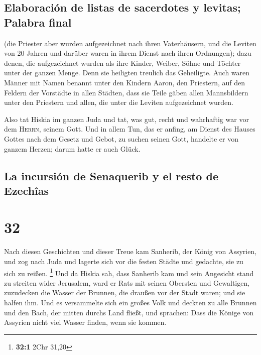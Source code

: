 \hypertarget{elaboraciuxf3n-de-listas-de-sacerdotes-y-levitas-palabra-final}{%
\subsection{Elaboración de listas de sacerdotes y levitas; Palabra
final}\label{elaboraciuxf3n-de-listas-de-sacerdotes-y-levitas-palabra-final}}

 (die Priester aber wurden aufgezeichnet nach ihren
Vaterhäusern, und die Leviten von 20 Jahren und darüber waren in ihrem
Dienst nach ihren Ordnungen);  dazu denen, die
aufgezeichnet wurden als ihre Kinder, Weiber, Söhne und Töchter unter
der ganzen Menge. Denn sie heiligten treulich das Geheiligte.
 Auch waren Männer mit Namen benannt unter den Kindern
Aaron, den Priestern, auf den Feldern der Vorstädte in allen Städten,
dass sie Teile gäben allen Mannsbildern unter den Priestern und allen,
die unter die Leviten aufgezeichnet wurden.

 Also tat Hiskia im ganzen Juda und tat, was gut, recht
und wahrhaftig war vor dem \textsc{Herrn}, seinem Gott. 
Und in allem Tun, das er anfing, am Dienst des Hauses Gottes nach dem
Gesetz und Gebot, zu suchen seinen Gott, handelte er von ganzem Herzen;
darum hatte er auch Glück.

\hypertarget{la-incursiuxf3n-de-senaquerib-y-el-resto-de-ezechuxeeas}{%
\subsection{La incursión de Senaquerib y el resto de
Ezechîas}\label{la-incursiuxf3n-de-senaquerib-y-el-resto-de-ezechuxeeas}}

\hypertarget{section-31}{%
\section{32}\label{section-31}}

 Nach diesen Geschichten und dieser Treue kam Sanherib,
der König von Assyrien, und zog nach Juda und lagerte sich vor die
festen Städte und gedachte, sie zu sich zu reißen. \footnote{\textbf{32:1}
  2Chr 31,20}  Und da Hiskia sah, dass Sanherib kam und
sein Angesicht stand zu streiten wider Jerusalem,  ward er
Rats mit seinen Obersten und Gewaltigen, zuzudecken die Wasser der
Brunnen, die draußen vor der Stadt waren; und sie halfen ihm.
 Und es versammelte sich ein großes Volk und deckten zu
alle Brunnen und den Bach, der mitten durchs Land fließt, und sprachen:
Dass die Könige von Assyrien nicht viel Wasser finden, wenn sie kommen.

